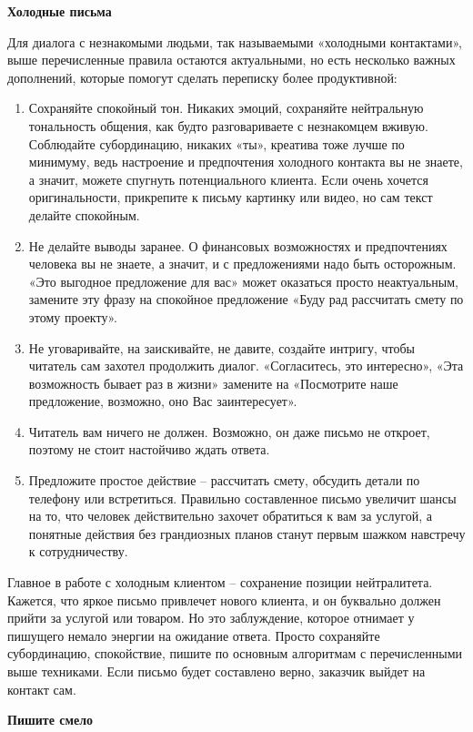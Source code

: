 \textbf{Холодные письма}

Для диалога с незнакомыми людьми, так называемыми «холодными контактами», выше перечисленные правила остаются актуальными, но есть несколько важных дополнений, которые помогут сделать переписку более продуктивной:
\begin{enumerate}
    \item Сохраняйте спокойный тон. Никаких эмоций, сохраняйте нейтральную тональность общения, как будто разговариваете с незнакомцем вживую. Соблюдайте субординацию, никаких «ты», креатива тоже лучше по минимуму, ведь настроение и предпочтения холодного контакта вы не знаете, а значит, можете спугнуть потенциального клиента. Если очень хочется оригинальности, прикрепите к письму картинку или видео, но сам текст делайте спокойным.
    \item Не делайте выводы заранее. О финансовых возможностях и предпочтениях человека вы не знаете, а значит, и с предложениями надо быть осторожным. «Это выгодное предложение для вас» может оказаться просто неактуальным, замените эту фразу на спокойное предложение «Буду рад рассчитать смету по этому проекту».
    \item Не уговаривайте, на заискивайте, не давите, создайте интригу, чтобы читатель сам захотел продолжить диалог. «Согласитесь, это интересно», «Эта возможность бывает раз в жизни» замените на «Посмотрите наше предложение, возможно, оно Вас заинтересует».
    \item Читатель вам ничего не должен. Возможно, он даже письмо не откроет, поэтому не стоит настойчиво ждать ответа.
    \item Предложите простое действие – рассчитать смету, обсудить детали по телефону или встретиться. Правильно составленное письмо увеличит шансы на то, что человек действительно захочет обратиться к вам за услугой, а понятные действия без грандиозных планов станут первым шажком навстречу к сотрудничеству.
\end{enumerate}

Главное в работе с холодным клиентом – сохранение позиции нейтралитета. Кажется, что яркое письмо привлечет нового клиента, и он буквально должен прийти за услугой или товаром. Но это заблуждение, которое отнимает у пишущего немало энергии на ожидание ответа. Просто сохраняйте субординацию, спокойствие, пишите по основным алгоритмам с перечисленными выше техниками. Если письмо будет составлено верно, заказчик выйдет на контакт сам.

\textbf{Пишите смело}

